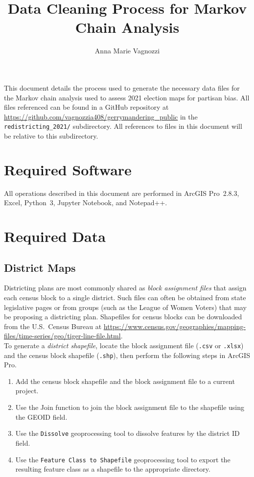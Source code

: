\documentclass[11pt]{article}
\title{\LARGE \textbf{Data Cleaning Process for Markov Chain Analysis}}
\author{\normalsize Anna Marie Vagnozzi}
\date{}
\begin{document}
 

\nobibliography*

\begin{singlespace}
\maketitle  
\end{singlespace}

This document details the process used to generate the necessary data files for the Markov chain analysis used to assess 2021 election maps for partisan bias. All files referenced can be found in a GitHub repository at \url{https://github.com/vagnozzia408/gerrymandering_public} in the \verb|redistricting_2021/| subdirectory. All references to files in this document will be relative to this subdirectory.

\section{Required Software}
All operations described in this document are performed in ArcGIS Pro~2.8.3, Excel, Python~3, Jupyter Notebook, and Notepad++.

\section{Required Data}

\subsection{District Maps}

Districting plans are most commonly shared as \textit{block assignment files} that assign each census block to a single district. Such files can often be obtained from state legislative pages or from groups (such as the League of Women Voters) that may be proposing a districting plan. Shapefiles for census blocks can be downloaded from the U.S.\ Census Bureau at \url{https://www.census.gov/geographies/mapping-files/time-series/geo/tiger-line-file.html}. \\

To generate a \textit{district shapefile}, locate the block assignment file (\verb|.csv| or \verb|.xlsx|) and the census block shapefile (\verb|.shp|), then perform the following steps in ArcGIS Pro.
\begin{enumerate}
	\item Add the census block shapefile and the block assignment file to a current project.
	\item Use the Join function to join the block assignment file to the shapefile using the GEOID field.
	\item Use the \verb|Dissolve| geoprocessing tool to dissolve features by the district ID field.
	\item Use the \verb|Feature Class to Shapefile| geoprocessing tool to export the resulting feature class as a shapefile to the appropriate directory.
\end{enumerate}
\end{document}

